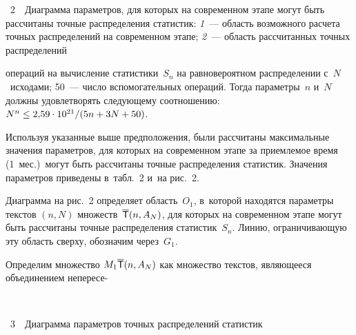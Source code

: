 \begin{multicols}{2}
{\noindent
{{\figurename~2}\ \ \small{Диаграмма параметров, для которых на современном этапе могут быть 
рассчитаны точные распределения статистик: \textit{1}~--- область возможного 
расчета точных распределений на современном этапе;
\textit{2}~--- область рассчитанных точных распределений}}
}



\vspace*{18pt}



\addtocounter{figure}{1}
\addtocounter{table}{1}

    
    
    \noindent
     операций на вычисление статистики~$S_n$ на 
равновероятном распределении с~$N$~исходами;
    50~--- число вспомогательных операций.
 Тогда параметры~$n$ и~$N$ должны удовлетворять следующему 
соотношению: $N^n\hm\leq2{,}59\cdot10^{21}/(5n \hm+ 3N \hm+ 50)$.
 
    Используя указанные выше предположения, были рассчитаны 
максимальные значения па\-ра\-мет\-ров, для которых на современном этапе за 
приемлемое время (1~мес.)\ могут быть рассчитаны точные 
распределения статистик. Значения параметров приведены в~табл.~2 и~на 
рис.~2.


    Диаграмма на рис.~2 определяет область~$O_1$, в~которой находятся 
параметры текстов $(n, N)$ множеств~$\overline{\sf T}(n, A_N)$, для 
которых на современном этапе могут быть рассчитаны точные 
распределения статистик~$S_n$. Линию, ограничивающую эту область 
сверху, обозначим через~$G_1$.
     
    Определим множество $M_1\overline{\sf T}(n, A_N)$ как множество текстов, 
являющееся объединением непересе-\linebreak\vspace*{-12pt}

\pagebreak

{ \begin{center}  %
 \vspace*{-6pt}
 \mbox{%
\epsfxsize=78.137mm
}
\end{center}

\vspace*{-3pt}

\noindent
{{\figurename~3}\ \ \small{Диаграмма параметров точных распределений статистик}}
}



\vspace*{12pt}




\end{multicols}
